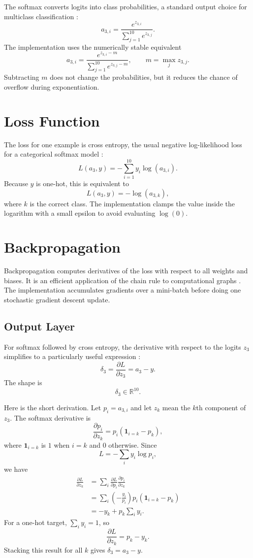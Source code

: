 \documentclass[11pt]{article}
\newcommand{\R}{\mathbb{R}}
\begin{document}
The softmax converts logits into class probabilities, a standard output choice
for multiclass classification \cite{bishop2006pattern,goodfellow2016deep}:
\[
    a_{3,i} = \frac{e^{z_{3,i}}}{\sum_{j=1}^{10} e^{z_{3,j}}}.
\]
The implementation uses the numerically stable equivalent
\[
    a_{3,i} = \frac{e^{z_{3,i} - m}}{\sum_{j=1}^{10} e^{z_{3,j} - m}},
    \qquad m = \max_j z_{3,j}.
\]
Subtracting $m$ does not change the probabilities, but it reduces the chance of
overflow during exponentiation.

\section{Loss Function}

The loss for one example is cross entropy, the usual negative log-likelihood loss
for a categorical softmax model \cite{bishop2006pattern,goodfellow2016deep}:
\[
    L(a_3, y) = -\sum_{i=1}^{10} y_i \log(a_{3,i}).
\]
Because $y$ is one-hot, this is equivalent to
\[
    L(a_3, y) = -\log(a_{3,k}),
\]
where $k$ is the correct class. The implementation clamps the value inside the
logarithm with a small epsilon to avoid evaluating $\log(0)$.

\section{Backpropagation}

Backpropagation computes derivatives of the loss with respect to all weights and
biases. It is an efficient application of the chain rule to computational graphs
\cite{rumelhart1986learning,goodfellow2016deep}. The implementation accumulates
gradients over a mini-batch before doing one stochastic gradient descent update.

\subsection{Output Layer}

For softmax followed by cross entropy, the derivative with respect to the logits
$z_3$ simplifies to a particularly useful expression \cite{bishop2006pattern}:
\[
    \delta_3 = \frac{\partial L}{\partial z_3} = a_3 - y.
\]
The shape is
\[
    \delta_3 \in \R^{10}.
\]

Here is the short derivation. Let $p_i = a_{3,i}$ and let $z_k$ mean the $k$th
component of $z_3$. The softmax derivative is
\[
    \frac{\partial p_i}{\partial z_k}
    = p_i(\mathbf{1}_{i=k} - p_k),
\]
where $\mathbf{1}_{i=k}$ is $1$ when $i=k$ and $0$ otherwise. Since
\[
    L = -\sum_i y_i \log p_i,
\]
we have
\[
\begin{aligned}
    \frac{\partial L}{\partial z_k}
    &= \sum_i \frac{\partial L}{\partial p_i}
       \frac{\partial p_i}{\partial z_k} \\
    &= \sum_i \left(-\frac{y_i}{p_i}\right)
       p_i(\mathbf{1}_{i=k} - p_k) \\
    &= -y_k + p_k \sum_i y_i.
\end{aligned}
\]
For a one-hot target, $\sum_i y_i = 1$, so
\[
    \frac{\partial L}{\partial z_k} = p_k - y_k.
\]
Stacking this result for all $k$ gives $\delta_3 = a_3 - y$.
\end{document}
